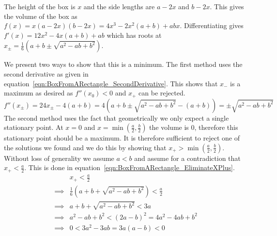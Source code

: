 \begin{solution}
	
	The height of the box is $x$ and the side lengths are $a - 2x$ and $b - 2x$. This gives the volume of the box as $f(x) = x(a - 2x)(b - 2x) = 4x^3 - 2x^2(a + b) + abx$. Differentiating gives $f'(x) = 12x^2 - 4x(a + b) + ab$ which has roots at $x_\pm = \frac{1}{6} \left( a + b \pm \sqrt{a^2 - ab + b^2} \right)$.
	
	We present two ways to show that this is a minimum. The first method uses the second derivative as given in equation~\ref{eqn:BoxFromARectangle_SecondDerivative}. This shows that $x_-$ is a maximum as desired as $f''(x_0) < 0$ and $x_+$ can be rejected.
	\begin{equation}
		f''(x_\pm) = 24x_\pm - 4(a + b) = 4\left( a + b \pm \sqrt{a^2 - ab + b^2} - (a + b) \right) = \pm \sqrt{a^2 - ab + b^2}
		\label{eqn:BoxFromARectangle_SecondDerivative}
	\end{equation}
	The second method uses the fact that geometrically we only expect a single stationary point. At $x = 0$ and $x = \min\left(\frac{a}{2}, \frac{b}{2} \right)$ the volume is 0, therefore this stationary point should be a maximum. It is therefore sufficient to reject one of the solutions we found and we do this by showing that $x_+ > \min\left( \frac{a}{2}, \frac{b}{2} \right)$. Without loss of generality we assume $a < b$ and assume for a contradiction that $x_+ < \frac{a}{2}$. This is done in equation~\ref{eqn:BoxFromARectangle_EliminateXPlus}.
	\begin{equation}
		\begin{aligned}
			& x_+ < \frac{a}{2}  \\
			\implies & \frac{1}{6} \left( a + b + \sqrt{a^2 - ab + b^2} \right) < \frac{a}{2}  \\
			\implies & a + b + \sqrt{a^2 - ab + b^2} < 3a  \\
			\implies & a^2 - ab + b^2 < (2a - b)^2 = 4a^2 - 4ab + b^2  \\
			\implies & 0 < 3a^2 - 3ab = 3a(a - b) < 0
		\end{aligned}
		\label{eqn:BoxFromARectangle_EliminateXPlus}
	\end{equation}
	
\end{solution}